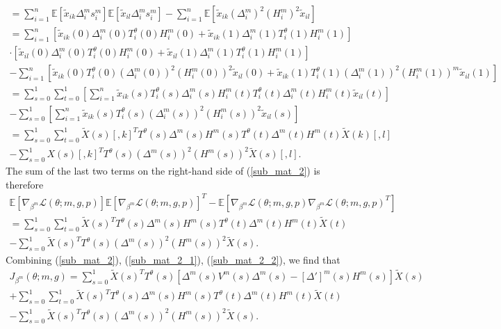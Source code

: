 \documentclass[12pt]{article}
\begin{document}
\begin{appendices}
\begin{refsection}
\begin{multline*}
		= \sum_{i=1}^n \mathbb{E}[\tilde{x}_{ik} \Delta^m_i s^m_i ] \mathbb{E} [ \tilde{x}_{il} \Delta^m_i s^m_i] - \sum_{i=1}^n \mathbb{E}[\tilde{x}_{ik} (\Delta_i^m)^2 (H_i^m)^2 \tilde{x}_{il}] \\ = \sum_{i=1}^n \left[\tilde{x}_{ik}(0) {\Delta}^m_i(0) T_i^{\theta}(0) {H}^m_i(0) + \tilde{x}_{ik}(1) {\Delta}^m_i(1) T_i^{\theta}(1) {H}^m_i(1) \right] \\ \cdot \left[ \tilde{x}_{il}(0) {\Delta}^m_i(0) T_i^{\theta}(0) {H}^m_i(0) + \tilde{x}_{il}(1) {\Delta}^m_i(1) T_i^{\theta}(1) {H}^m_i(1) \right] \\ - \sum_{i=1}^n \left[ \tilde{x}_{ik}(0) T_i^{\theta}(0) (\Delta_i^m(0))^2 ({H}_i^m(0))^2 \tilde{x}_{il}(0)  + \tilde{x}_{ik}(1) T_i^{\theta}(1) ({\Delta}^m_i(1))^2 ({H}_i^m(1))^m \tilde{x}_{il}(1) \right] \\ = \sum_{s=0}^1 \sum_{t=0}^1 \left[ \sum_{i=1}^n \tilde{x}_{ik}(s) T^{\theta}_i(s) {\Delta}^m_i(s) {H}^m_i(t) T_i^{\theta}(t){\Delta}^m_i(t) {H}^m_i(t) \tilde{x}_{il}(t) \right] \\ - \sum_{s=0}^1 \left[\sum_{i=1}^n \tilde{x}_{ik}(s) T_i^\theta(s) ({\Delta}^m_i(s))^2 ({H}_i^m(s))^2 \tilde{x}_{il}(s) \right] \\ = \sum_{s=0}^1 \sum_{t=0}^1 \tilde{X}(s)[,k]^T {T}^\theta(s) {\Delta}^m(s) {H}^m(s) {T}^\theta(t) {\Delta}^m(t) {H}^m(t) \tilde{X}(k)[,l] \\ - \sum_{s=0}^1{X}(s)[,k]^T {T}^\theta(s) ({\Delta}^m(s))^2 ({H}^m(s))^2 \tilde{X}(s)[,l].
		\end{multline*}
		The sum of the last two terms on the right-hand side of (\ref{sub_mat_2}) is therefore
		\begin{multline}\label{sub_mat_2_2}
		\mathbb{E} \left[ \nabla_{\beta^m} \mathcal{L}(\theta; m, g, p) \right] \mathbb{E} \left[ \nabla_{\beta^m} \mathcal{L}(\theta; m, g, p) \right]^T - \mathbb{E} \left[\nabla_{\beta^m} \mathcal{L}(\theta; m, g, p) \nabla_{\beta^m} \mathcal{L}(\theta; m, g, p)^T \right] \\ =
		\sum_{s=0}^1 \sum_{t=0}^1 \tilde{X}(s)^T {T}^\theta(s) {\Delta}^m(s) {H}^m(s) T^{\theta}(t) {\Delta}^m(t) {H}^m(t) \tilde{X}(t) \\ - \sum_{s=0}^1 \tilde{X}(s)^T {T}^\theta(s) ({\Delta}^m(s))^2 ({H}^m(s))^2 \tilde{X}(s). \end{multline}
		Combining (\ref{sub_mat_2}), (\ref{sub_mat_2_1}), (\ref{sub_mat_2_2}), we find that
		\begin{multline}\label{sub_mat_2_formula}
		J_{\beta^m}(\theta; m, g) = \sum_{s=0}^1 \tilde{X}(s)^T T^{\theta}(s) \left[ {\Delta}^m(s) {V}^m(s) {\Delta}^m(s) - [{\Delta}']^m(s) {H}^m(s) \right] \tilde{X}(s) \\ + \sum_{s=0}^1 \sum_{t=0}^1 \tilde{X}(s)^T {T}^\theta(s) {\Delta}^m(s) {H}^m(s) {T}^\theta(t) {\Delta}^m(t) {H}^m(t) \tilde{X}(t) \\ - \sum_{s=0}^1 \tilde{X}(s)^T T^{\theta}(s) ({\Delta}^m(s))^2 ({H}^m(s))^2 \tilde{X}(s).
		\end{multline}
		

\end{refsection}
\end{appendices}
\end{document}
